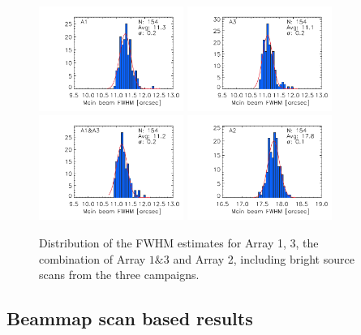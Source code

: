 \begin{figure}[ht!]
\begin{center}
  \includegraphics[clip, width=0.42\textwidth]{Figures/Beams/plot_histo_FWHM_mb_radius_binning2_a1.pdf}
  \includegraphics[clip, width=0.42\textwidth]{Figures/Beams/plot_histo_FWHM_mb_radius_binning2_a3.pdf}
  \includegraphics[clip, width=0.42\textwidth]{Figures/Beams/plot_histo_FWHM_mb_radius_binning2_1mm.pdf}
  \includegraphics[clip, width=0.42\textwidth]{Figures/Beams/plot_histo_FWHM_mb_radius_binning2_a2.pdf}
  \caption[Main Beam FWHM distributions]{Distribution of the FWHM estimates for Array 1, 3, the combination of Array $1\&3$ and Array 2, including bright source scans from the three campaigns.}
\label{fig:fwhm_map}
\end{center}
\end{figure}

\subsection{Beammap scan based results}
\label{se:mb_with_beammap}

